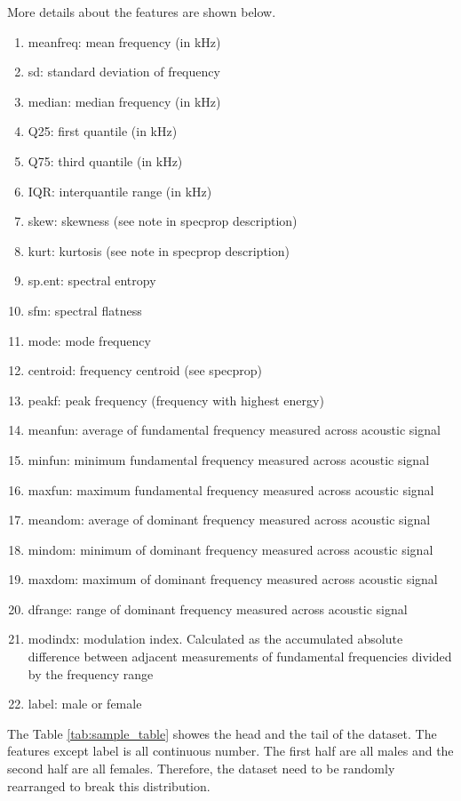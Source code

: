 \documentclass[12pt,a4paper]{article}
\theoremstyle{definition}
\begin{document}
\noindent
More details about the features are shown below.\cite{kaggle}

\begin{enumerate}
\item meanfreq: mean frequency (in kHz)
\item sd: standard deviation of frequency
\item median: median frequency (in kHz)
\item Q25: first quantile (in kHz)
\item Q75: third quantile (in kHz)
\item IQR: interquantile range (in kHz)
\item skew: skewness (see note in specprop description)
\item kurt: kurtosis (see note in specprop description)
\item sp.ent: spectral entropy
\item sfm: spectral flatness
\item mode: mode frequency
\item centroid: frequency centroid (see specprop)
\item peakf: peak frequency (frequency with highest energy)
\item meanfun: average of fundamental frequency measured across acoustic signal
\item minfun: minimum fundamental frequency measured across acoustic signal
\item maxfun: maximum fundamental frequency measured across acoustic signal
\item meandom: average of dominant frequency measured across acoustic signal
\item mindom: minimum of dominant frequency measured across acoustic signal
\item maxdom: maximum of dominant frequency measured across acoustic signal
\item dfrange: range of dominant frequency measured across acoustic signal
\item modindx: modulation index. Calculated as the accumulated absolute difference between adjacent measurements of fundamental frequencies divided by the frequency range
\item label: male or female 
\end{enumerate}

\noindent
The Table \ref{tab:sample_table} showes the head and the tail of the dataset. The features except label is all continuous number. The first half are all males and the second half are all females. Therefore, the dataset need to be randomly rearranged to break this distribution. \\
\end{document}
